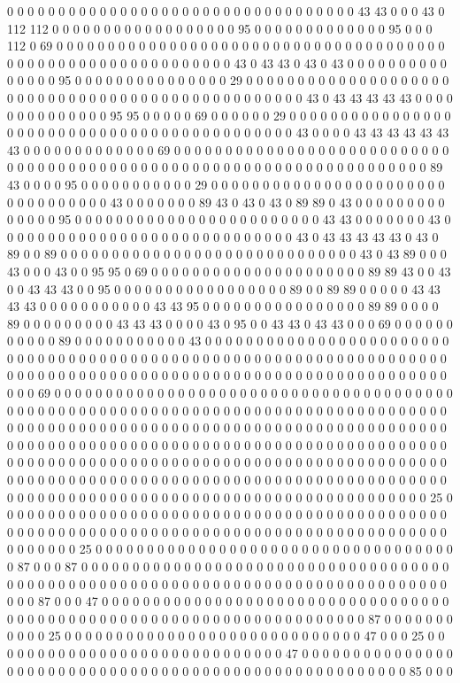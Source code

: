 0 0 0 0 0 0 0 0 0 0 0 0 0 0 0 0 0 0 0 0 0 0 0 0 0 0 0 0 0 0 0 0 0 0 43 43 0 0 0 43 0 112 112 0 0 0 0 0 0 0 0 0 0 0 0 0 0 0 0 0 0 95 0 0 0 0 0 0 0 0 0 0 0 0 0 95 0 0 0 112 0 69 0 0 0 0 0 0 0 0 0 0 0 0 0 0 0 0 0 0 0 0 0 0 0 0 0 0 0 0 0 0 0 0 0 0 0 0 0 0 0 0 0 0 0 0 0 0 0 0 0 0 0 0 0 0 0 0 0 0 0 0 43 0 43 43 0 43 0 43 0 0 0 0 0 0 0 0 0 0 0 0 0 0 0 95 0 0 0 0 0 0 0 0 0 0 0 0 0 0 0 29 0 0 0 0 0 0 0 0 0 0 0 0 0 0 0 0 0 0 0 0 0 0 0 0 0 0 0 0 0 0 0 0 0 0 0 0 0 0 0 0 0 0 0 0 0 0 0 0 0 43 0 43 43 43 43 43 0 0 0 0 0 0 0 0 0 0 0 0 0 0 95 95 0 0 0 0 0 69 0 0 0 0 0 0 29 0 0 0 0 0 0 0 0 0 0 0 0 0 0 0 0 0 0 0 0 0 0 0 0 0 0 0 0 0 0 0 0 0 0 0 0 0 0 0 0 0 0 0 0 43 0 0 0 0 43 43 43 43 43 43 43 0 0 0 0 0 0 0 0 0 0 0 0 0 69 0 0 0 0 0 0 0 0 0 0 0 0 0 0 0 0 0 0 0 0 0 0 0 0 0 0 0 0 0 0 0 0 0 0 0 0 0 0 0 0 0 0 0 0 0 0 0 0 0 0 0 0 0 0 0 0 0 0 0 0 0 0 0 0 0 0 0 0 89 43 0 0 0 0 95 0 0 0 0 0 0 0 0 0 0 0 29 0 0 0 0 0 0 0 0 0 0 0 0 0 0 0 0 0 0 0 0 0 0 0 0 0 0 0 0 0 0 0 0 0 43 0 0 0 0 0 0 0 89 43 0 43 0 43 0 89 89 0 43 0 0 0 0 0 0 0 0 0 0 0 0 0 0 95 0 0 0 0 0 0 0 0 0 0 0 0 0 0 0 0 0 0 0 0 0 0 0 0 43 43 0 0 0 0 0 0 0 43 0 0 0 0 0 0 0 0 0 0 0 0 0 0 0 0 0 0 0 0 0 0 0 0 0 0 0 0 0 43 0 43 43 43 43 43 0 43 0 89 0 0 89 0 0 0 0 0 0 0 0 0 0 0 0 0 0 0 0 0 0 0 0 0 0 0 0 0 0 0 0 0 43 0 43 89 0 0 0 43 0 0 0 43 0 0 95 95 0 69 0 0 0 0 0 0 0 0 0 0 0 0 0 0 0 0 0 0 0 0 0 89 89 43 0 0 43 0 0 43 43 43 0 0 95 0 0 0 0 0 0 0 0 0 0 0 0 0 0 0 0 0 89 0 0 89 89 0 0 0 0 0 43 43 43 43 0 0 0 0 0 0 0 0 0 0 0 43 43 95 0 0 0 0 0 0 0 0 0 0 0 0 0 0 0 0 89 89 0 0 0 0 89 0 0 0 0 0 0 0 0 0 43 43 43 0 0 0 0 43 0 95 0 0 43 43 0 43 43 0 0 0 69 0 0 0 0 0 0 0 0 0 0 0 89 0 0 0 0 0 0 0 0 0 0 0 43 0 0 0 0 0 0 0 0 0 0 0 0 0 0 0 0 0 0 0 0 0 0 0 0 0 0 0 0 0 0 0 0 0 0 0 0 0 0 0 0 0 0 0 0 0 0 0 0 0 0 0 0 0 0 0 0 0 0 0 0 0 0 0 0 0 0 0 0 0 0 0 0 0 0 0 0 0 0 0 0 0 0 0 0 0 0 0 0 0 0 0 0 0 0 0 0 0 0 0 0 0 0 0 0 0 0 0 0 0 0 0 0 0 69 0 0 0 0 0 0 0 0 0 0 0 0 0 0 0 0 0 0 0 0 0 0 0 0 0 0 0 0 0 0 0 0 0 0 0 0 0 0 0 0 0 0 0 0 0 0 0 0 0 0 0 0 0 0 0 0 0 0 0 0 0 0 0 0 0 0 0 0 0 0 0 0 0 0 0 0 0 0 0 0 0 0 0 0 0 0 0 0 0 0 0 0 0 0 0 0 0 0 0 0 0 0 0 0 0 0 0 0 0 0 0 0 0 0 0 0 0 0 0 0 0 0 0 0 0 0 0 0 0 0 0 0 0 0 0 0 0 0 0 0 0 0 0 0 0 0 0 0 0 0 0 0 0 0 0 0 0 0 0 0 0 0 0 0 0 0 0 0 0 0 0 0 0 0 0 0 0 0 0 0 0 0 0 0 0 0 0 0 0 0 0 0 0 0 0 0 0 0 0 0 0 0 0 0 0 0 0 0 0 0 0 0 0 0 0 0 0 0 0 0 0 0 0 0 0 0 0 0 0 0 0 0 0 0 0 0 0 0 0 0 0 0 0 0 0 0 0 0 0 0 0 0 0 0 0 0 0 0 0 0 0 0 0 0 0 0 0 0 0 0 0 0 0 0 0 0 0 0 0 0 0 0 0 0 0 0 0 0 0 0 0 0 0 0 0 25 0 0 0 0 0 0 0 0 0 0 0 0 0 0 0 0 0 0 0 0 0 0 0 0 0 0 0 0 0 0 0 0 0 0 0 0 0 0 0 0 0 0 0 0 0 0 0 0 0 0 0 0 0 0 0 0 0 0 0 0 0 0 0 0 0 0 0 0 0 0 0 0 0 0 0 0 0 0 0 0 0 0 0 0 0 0 0 0 0 0 0 0 0 0 25 0 0 0 0 0 0 0 0 0 0 0 0 0 0 0 0 0 0 0 0 0 0 0 0 0 0 0 0 0 0 0 0 0 0 0 0 87 0 0 0 87 0 0 0 0 0 0 0 0 0 0 0 0 0 0 0 0 0 0 0 0 0 0 0 0 0 0 0 0 0 0 0 0 0 0 0 0 0 0 0 0 0 0 0 0 0 0 0 0 0 0 0 0 0 0 0 0 0 0 0 0 0 0 0 0 0 0 0 0 0 0 0 0 0 0 0 0 0 0 0 0 0 0 87 0 0 0 47 0 0 0 0 0 0 0 0 0 0 0 0 0 0 0 0 0 0 0 0 0 0 0 0 0 0 0 0 0 0 0 0 0 0 0 0 0 0 0 0 0 0 0 0 0 0 0 0 0 0 0 0 0 0 0 0 0 0 0 0 0 0 0 0 0 0 0 0 0 87 0 0 0 0 0 0 0 0 0 0 0 25 0 0 0 0 0 0 0 0 0 0 0 0 0 0 0 0 0 0 0 0 0 0 0 0 0 0 0 0 0 47 0 0 0 25 0 0 0 0 0 0 0 0 0 0 0 0 0 0 0 0 0 0 0 0 0 0 0 0 0 0 0 0 0 47 0 0 0 0 0 0 0 0 0 0 0 0 0 0 0 0 0 0 0 0 0 0 0 0 0 0 0 0 0 0 0 0 0 0 0 0 0 0 0 0 0 0 0 0 0 0 0 0 0 0 0 0 0 0 85 0 0 0 